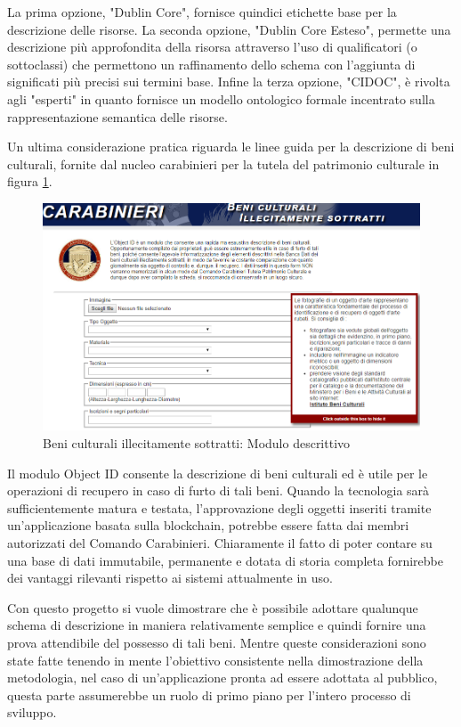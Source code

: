 La prima opzione, "Dublin Core", fornisce quindici etichette base per la descrizione delle risorse. La seconda opzione, "Dublin Core Esteso", permette una descrizione più approfondita della risorsa attraverso l'uso di qualificatori (o sottoclassi) che permettono un raffinamento dello schema con l'aggiunta di significati più precisi sui termini base. Infine la terza opzione, "CIDOC", è rivolta agli "esperti" in quanto fornisce un modello ontologico formale incentrato sulla rappresentazione semantica delle risorse.

Un ultima considerazione pratica riguarda le linee guida per la descrizione di beni culturali, fornite dal nucleo carabinieri per la tutela del patrimonio culturale in figura \ref{fig:carabinieriTPC}.

\begin{figure}[H]
\centering
\includegraphics[width=1\textwidth]{immagini/carabinieriTPC2.png}
\caption{Beni culturali illecitamente sottratti: Modulo descrittivo}
\label{fig:carabinieriTPC}
\end{figure}

Il modulo Object ID consente la descrizione di beni culturali ed è utile per le operazioni di recupero in caso di furto di tali beni. Quando la tecnologia sarà sufficientemente matura e testata, l'approvazione degli oggetti inseriti tramite un'applicazione basata sulla blockchain, potrebbe essere fatta dai membri autorizzati del Comando Carabinieri. Chiaramente il fatto di poter contare su una base di dati immutabile, permanente e dotata di storia completa fornirebbe dei vantaggi rilevanti rispetto ai sistemi attualmente in uso.

Con questo progetto si vuole dimostrare che è possibile adottare qualunque schema di descrizione in maniera relativamente semplice e quindi fornire una prova attendibile del possesso di tali beni. Mentre queste considerazioni sono state fatte tenendo in mente l'obiettivo consistente nella dimostrazione della metodologia, nel caso di un’applicazione pronta ad essere adottata al pubblico, questa parte assumerebbe un ruolo di primo piano per l'intero processo di sviluppo.

